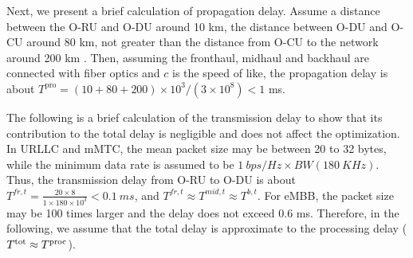 \documentclass[lettersize,journal]{IEEEtran}
\begin{document}
Next, we present a brief calculation of propagation delay.
Assume a distance between the O-RU and O-DU around 10 km, the distance between O-DU and O-CU around 80 km, not greater than the distance from O-CU to the network around 200 km \cite{oranD1}. Then, assuming the fronthaul, midhaul and backhaul are connected with fiber optics and $c$ is the speed of like, the propagation delay is about $T^{\text{pro}} = (10 + 80 + 200)\times 10^3 /(3\times 10^8) < 1$ ms.

The following is a brief calculation of the transmission delay to show that its contribution to the total delay is negligible and does not affect the optimization.
In URLLC and mMTC, the mean packet size may be between 20 to 32 bytes, while the minimum data rate is assumed to be $1\ bps/Hz \times BW (180\ KHz)$. Thus, the transmission delay from O-RU to O-DU is about $T^{fr,t} = \frac{20\times 8}{1 \times 180 \times 10^3} < 0.1\ ms$, and $T^{fr,t} \approx T^{mid,t} \approx T^{b,t}$. For eMBB, the packet size may be 100 times larger and the delay does not exceed 0.6 ms.
Therefore, in the following, we assume that the total delay is approximate to the processing delay ($T^{\text{\text{tot}}} \approx T^{\text{proc}}$).
\end{document}
